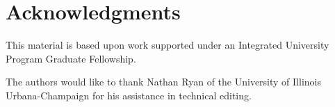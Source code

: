 \section{Acknowledgments}
This material is based upon work supported under an Integrated University Program Graduate
Fellowship.

The authors would like to thank Nathan Ryan of the University of Illinois 
Urbana-Champaign for his assistance in technical editing.